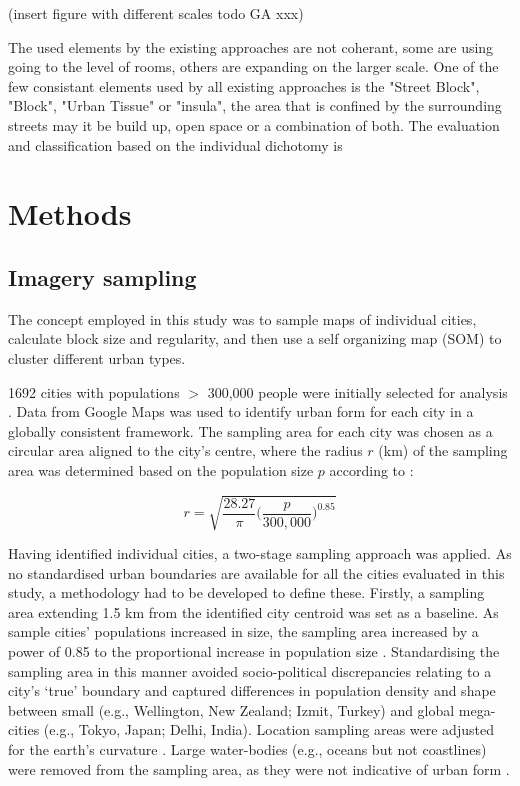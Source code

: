\documentclass[final,3p,times,authoryear]{elsarticle}
\begin{document}
(insert figure with different scales todo GA xxx)

The used elements by the existing approaches are not coherant, some are using going to the level of rooms, others are expanding on the larger scale. One of the few consistant elements used by all existing approaches is the "Street Block", "Block", "Urban Tissue" or "insula", the area that is confined by the surrounding streets may it be build up, open space or a combination of both.
The evaluation and classification based on the individual dichotomy is 



\section{Methods}\label{sec:Methods}

\subsection{Imagery sampling}\label{sec:methods2}
The concept employed in this study was to sample maps of individual cities, calculate block size and regularity, and then use a self organizing map (SOM) to cluster different urban types.

1692 cities with populations $>$ 300,000 people were initially selected for analysis \citep{UN2014}. Data from Google Maps was used to identify urban form for each city in a globally consistent framework. The sampling area for each city was chosen as a circular area aligned to the city's centre, where the radius $r$ (km) of the sampling area was determined based on the population size $p$ according to \citet{Barthelemy2016}: 

\begin{equation}
r = \sqrt{ \frac{28.27}{\pi} \bigg( \frac{p}{300,000}  \bigg)^{0.85} }
\end{equation}


Having identified individual cities, a two-stage sampling approach was applied. As no standardised urban boundaries are available for all the cities evaluated in this study, a methodology had to be developed to define these. Firstly, a sampling area extending 1.5 km from the identified city centroid \citep{UN2014} was set as a baseline. As sample cities' populations increased in size, the sampling area increased by a power of 0.85 to the proportional increase in population size \citep{Barthelemy2016}. Standardising the sampling area in this manner avoided socio-political discrepancies relating to a city's `true' boundary and captured differences in population density and shape between small (e.g., Wellington, New Zealand; Izmit, Turkey) and global mega-cities (e.g., Tokyo, Japan;  Delhi, India). Location sampling areas were adjusted for the earth's curvature \citep{Sinnott1984}. Large water-bodies (e.g., oceans but not coastlines) were removed from the sampling area, as they were not indicative of urban form . 
\end{document}

